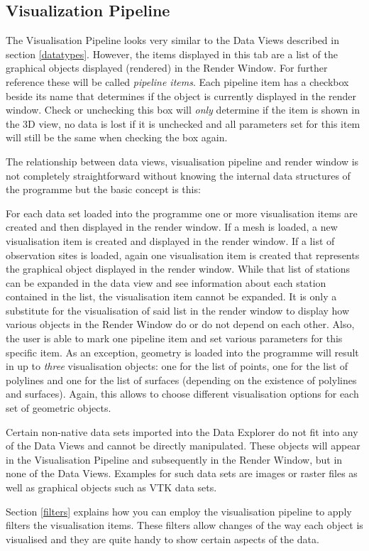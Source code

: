 \subsection{Visualization Pipeline}

The Visualisation Pipeline looks very similar to the Data Views described in section \ref{datatypes}. However, the items displayed in this tab are a list of the graphical objects displayed (rendered) in the Render Window. For further reference these will be called \emph{pipeline items}. Each pipeline item has a checkbox beside its name that determines if the object is currently displayed in the render window. Check or unchecking this box will \emph{only} determine if the item is shown in the 3D view, no data is lost if it is unchecked and all parameters set for this item will still be the same when checking the box again.

The relationship between data views, visualisation pipeline and render window is not completely straightforward without knowing the internal data structures of the programme but the basic concept is this:

For each data set loaded into the programme one or more visualisation items are created and then displayed in the render window. If a mesh is loaded, a new visualisation item is created and displayed in the render window. If a list of observation sites is loaded, again one visualisation item is created that represents the graphical object displayed in the render window. While that list of stations can be expanded in the data view and see information about each station contained in the list, the visualisation item cannot be expanded. It is only a substitute for the visualisation of said list in the render window to display how various objects in the Render Window do or do not depend on each other. Also, the user is able to mark one pipeline item and set various parameters for this specific item. As an exception, geometry is loaded into the programme will result in up to \emph{three} visualisation objects: one for the list of points, one for the list of polylines and one for the list of surfaces (depending on the existence of polylines and surfaces). Again, this allows to choose different visualisation options for each set of geometric objects.

Certain non-native data sets imported into the Data Explorer do not fit into any of the Data Views and cannot be directly manipulated. These objects will appear in the Visualisation Pipeline and subsequently in the Render Window, but in none of the Data Views. Examples for such data sets are images or raster files as well as graphical objects such as VTK data sets.

Section \ref{filters} explains how you can employ the visualisation pipeline to apply filters the visualisation items. These filters allow changes of the way each object is visualised and they are quite handy to show certain aspects of the data.

